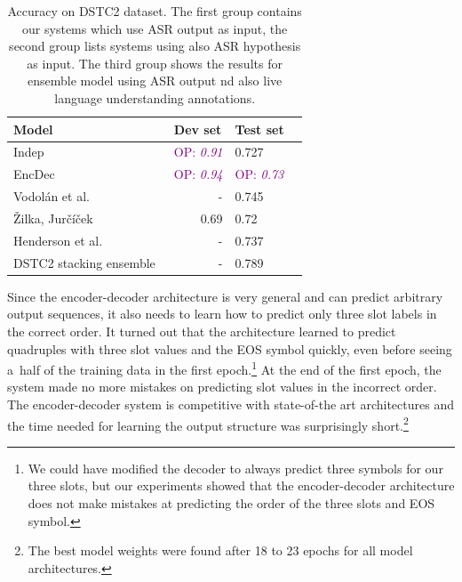 \documentclass{itatnew}
\def\OP#1{\textcolor{purple}{OP: \textit{#1}}}
\begin{document}
\begin{table}
\vspace{-0.80em}
\begin{center}
\begin{tabular}{l@{\quad}rll}
\hline
\multicolumn{1}{l}{\rule{0pt}{12pt}
                   Model}&\multicolumn{1}{l}{Dev set}&\multicolumn{2}{l}{Test set}\\[2pt]
\hline\rule{0pt}{12pt}
    Indep  &   \OP{0.91} & 0.727 \\
    EncDec &   \OP{0.94} & \OP{0.73} \\
\hline
    Vodolán et al.~\cite{vodolan2015hybrid} & - & 0.745 \\
    Žilka, Jurčíček~\cite{zilka2015incremental} & 0.69 & 0.72 \\
    Henderson et al.~\cite{henderson2013deep} & - & 0.737 \\
\hline
    DSTC2 stacking ensemble~\cite{henderson2014second} & - & 0.789 \\
\hline
\end{tabular}
\caption{Accuracy on DSTC2 dataset. The first group contains our systems which use ASR output as input, the second group lists systems using also ASR hypothesis as input. The third group shows the results for ensemble model using ASR output nd also live language understanding annotations.}
\vspace{-2em}
\end{center}
\label{tab:dstc}
\end{table}

Since the encoder-decoder architecture is very general and can predict arbitrary output sequences, it also needs to learn how to predict only three slot labels in the correct order.
It turned out that the architecture learned to predict quadruples with three slot values and the EOS symbol quickly, even before seeing a~half of the training data in the first epoch.\footnote{We could have modified the decoder to always predict three symbols for our three slots, but our experiments showed that the encoder-decoder architecture does not make mistakes at predicting the order of the three slots and EOS symbol.}  
At the end of the first epoch, the system made no more mistakes on predicting slot values in the incorrect order.
The encoder-decoder system is competitive with state-of-the art architectures and the time needed for learning the output structure was surprisingly short.\footnote{The best model weights were found after 18 to 23 epochs for all model architectures.}
\end{document}
